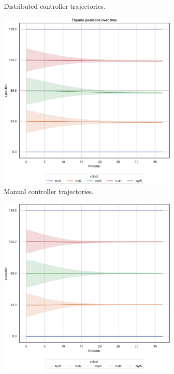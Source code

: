 \begin{figure}[!htb]
\begin{center}
\begin{subfigure}[h]{0.49\textwidth}
			\caption{Distributed controller trajectories.}
		\end{subfigure}
	\end{center}
	\begin{center}
		\begin{subfigure}[h]{0.49\textwidth}
			\centering			
			\includegraphics[width=.9\textwidth]{contents/images/net-d9/position-overtime-manual}%
			\caption{Manual controller trajectories.}
		\end{subfigure}
		\hfill
		\begin{subfigure}[h]{0.49\textwidth}
			\centering
			\includegraphics[width=.9\textwidth]{contents/images/net-c9/position-overtime-learned_communication}

\end{subfigure}
\end{center}
\end{figure}
